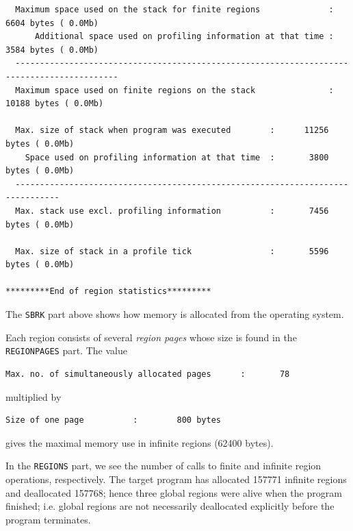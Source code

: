 \documentclass[12pt]{book}
\begin{document}
\begin{scriptsize}
\begin{verbatim}
  Maximum space used on the stack for finite regions              :       6604 bytes ( 0.0Mb)
      Additional space used on profiling information at that time :       3584 bytes ( 0.0Mb)
  -------------------------------------------------------------------------------------------
  Maximum space used on finite regions on the stack               :      10188 bytes ( 0.0Mb)

  Max. size of stack when program was executed        :      11256 bytes ( 0.0Mb)
    Space used on profiling information at that time  :       3800 bytes ( 0.0Mb)
  -------------------------------------------------------------------------------
  Max. stack use excl. profiling information          :       7456 bytes ( 0.0Mb)

  Max. size of stack in a profile tick                :       5596 bytes ( 0.0Mb)

*********End of region statistics*********
\end{verbatim}
\end{scriptsize}
\noindent
The {\tt SBRK} part above shows how memory is allocated from the operating
system.

Each region consists of several \emph{region pages} whose size is found in
the {\tt REGIONPAGES} part. The value
\begin{footnotesize}
\begin{verbatim}
Max. no. of simultaneously allocated pages      :       78
\end{verbatim}
\end{footnotesize}
\noindent 
multiplied by
\begin{footnotesize}
\begin{verbatim}
Size of one page          :        800 bytes
\end{verbatim}
\end{footnotesize}
\noindent 
gives the maximal memory use in infinite regions (62400 bytes).

In the {\tt REGIONS} part, we see the number of calls to finite and
infinite region operations, respectively. The target program has allocated
157771 infinite regions and deallocated 157768; hence three global regions were
alive when the program finished; i.e. global regions are not
necessarily deallocated explicitly before the program terminates.
\end{document}
